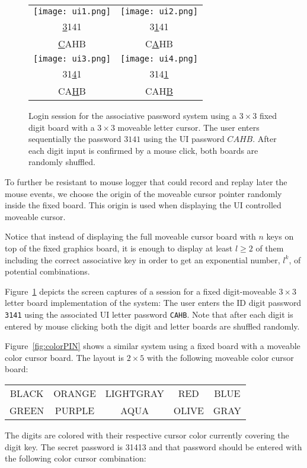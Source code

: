 \documentclass[12pt,onecolumn]{article}
\begin{document}
\begin{figure}
\centering

\begin{tabular}{cc}
\texttt{[image: ui1.png]} & \texttt{[image: ui2.png]} \\
\underline{3}141 & 3\underline{1}41 \\
\underline{C}AHB & C\underline{A}HB \\ 
\texttt{[image: ui3.png]} & \texttt{[image: ui4.png]} \\
31\underline{4}1 & 314\underline{1} \\
CA\underline{H}B & CAH\underline{B} \\ 
\end{tabular}
 
\caption{\label{fig:session}Login session for the associative password system using a $3\times 3$ fixed digit board with a   $3\times 3$ moveable letter cursor. The user enters sequentially the password $3141$ using the UI password  $CAHB$. After each digit input is confirmed by a mouse click, both boards are randomly shuffled.}
\end{figure}

To further be resistant to mouse logger that could record and replay later the mouse events, we choose the origin of the moveable cursor pointer randomly inside the fixed board. This origin is used when displaying the UI controlled moveable cursor. 

Notice that instead of displaying the full moveable cursor board with $n$ keys on top of the fixed graphics board, it is enough to display at least $l\geq 2$ of them including the correct associative key in order to get an exponential number, $l^k$, of potential combinations. 

Figure~\ref{fig:session} depicts the screen captures of a session for a fixed digit-moveable $3\times 3$ letter board implementation of the system:
 The user enters the ID digit password {\tt 3141} using the associated UI letter password {\tt CAHB}. 
 Note that after each digit is entered by mouse clicking both the digit and letter boards are shuffled randomly.
 
 

 

Figure~\ref{fig:colorPIN} shows a similar system using a fixed board with a moveable color cursor board. The layout is $2\times 5$ with the following
 moveable color cursor board:\\
 \begin{center}
 \begin{tabular}{ccccc}
 BLACK & ORANGE & LIGHTGRAY& RED& BLUE\\
  GREEN& PURPLE & AQUA & OLIVE & GRAY
  \end{tabular}
  \end{center}
The digits are colored with their respective cursor color currently covering the digit key.
The secret password is 31413 and that password should be entered with the following color cursor combination:\\
\end{document}
